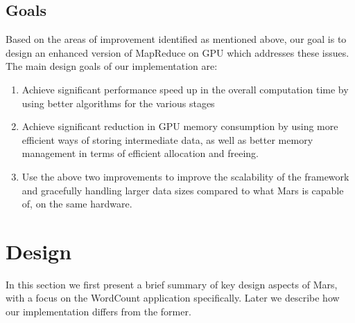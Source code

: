 \documentclass{article}
\begin{document}
\subsection{Goals}
Based on the areas of improvement identified as mentioned above, our goal is to design an enhanced version of MapReduce on GPU which addresses these issues. The main design goals of our implementation are:
\begin{enumerate}
    \item Achieve significant performance speed up in the overall computation time by using better algorithms for the various stages
    \item Achieve significant reduction in GPU memory consumption by using more efficient ways of storing intermediate data, as well as better memory management in terms of efficient allocation and freeing.
    \item Use the above two improvements to improve the scalability of the framework and gracefully handling larger data sizes compared to what Mars is capable of, on the same hardware.
\end{enumerate}

\section{Design}
In this section we first present a brief summary of key design aspects of Mars, with a focus on the WordCount application specifically. Later we describe how our implementation differs from the former.
\end{document}
